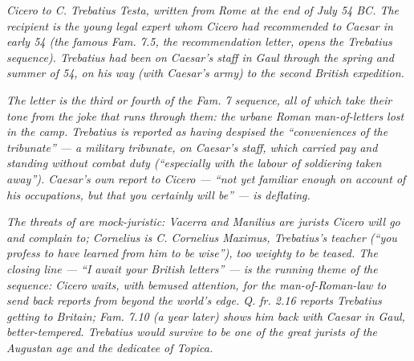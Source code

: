 
\textit{Cicero to C. Trebatius Testa, written from Rome at the
end of July 54 BC. The recipient is the young legal expert
whom Cicero had recommended to Caesar in early 54 (the famous
\textit{Fam.} 7.5, the recommendation letter, opens the Trebatius
sequence). Trebatius had been on Caesar's staff in Gaul through
the spring and summer of 54, on his way (with Caesar's army)
to the second British expedition.}

\textit{The letter is the third or fourth of the Fam. 7
sequence, all of which take their tone from the joke that runs
through them: the urbane Roman man-of-letters lost in the
camp. Trebatius is reported as having despised the
``conveniences of the tribunate'' --- a military tribunate, on
Caesar's staff, which carried pay and standing without combat
duty (``especially with the labour of soldiering taken
away''). Caesar's own report to Cicero --- ``not yet familiar
enough on account of his occupations, but that you certainly
will be'' --- is deflating.}

\textit{The threats of  are mock-juristic:
Vacerra and Manilius are jurists Cicero will go and complain
to; Cornelius is C. Cornelius Maximus, Trebatius's teacher
(``you profess to have learned from him to be wise''), too
weighty to be teased. The closing line --- ``I await your
British letters'' --- is the running theme of the sequence:
Cicero waits, with bemused attention, for the man-of-Roman-law
to send back reports from beyond the world's edge. \textit{Q.
fr.} 2.16 reports Trebatius getting to Britain; \textit{Fam.}
7.10 (a year later) shows him back with Caesar in Gaul,
better-tempered. Trebatius would survive to be one of the
great jurists of the Augustan age and the dedicatee of
\textit{Topica}.}
